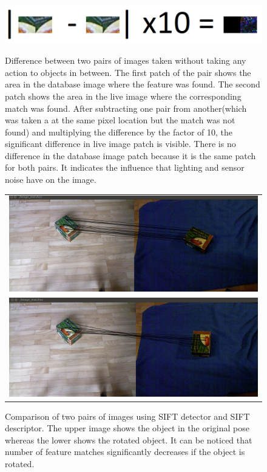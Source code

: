 \begin{figure}
\centering

{\includegraphics[width=1\columnwidth]{figures/patches.png}}

\caption{Difference between two pairs of images taken without taking any action to objects in between. The first patch of the pair shows the area in the database image where the feature was found. The second patch shows the area in the live image where the corresponding match was found. After subtracting one pair from another(which was taken a at the same pixel location but the match was not found) and multiplying the difference by the factor of 10, the significant difference in live image patch is visible. There is no difference in the database image patch because it is the same patch for both pairs.  It indicates the influence that lighting and sensor noise have on the image. }
\label{fig:patches}
\end{figure}

\begin{figure}
\centering
    \begin{tabular}{c}
 

\includegraphics[width=0.7\columnwidth]{figures/sift-gpu-no-rotation.png}\\
\includegraphics[width=0.7\columnwidth]{figures/siftgpu-rotation.png}\\
    \end{tabular}


\caption{Comparison of two pairs of images using SIFT detector and SIFT descriptor. The upper image shows the object in the original pose whereas the lower shows the rotated object. It can be noticed that number of feature matches significantly decreases if the object is rotated. }
\label{fig:sift-features}
\end{figure}

